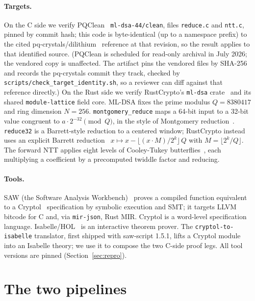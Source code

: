 \documentclass[journal=tches,submission,review]{iacrtrans}
\newcommand{\code}[1]{\texttt{#1}}
\begin{document}
\paragraph{Targets.} On the C side we verify PQClean~\cite{pqclean} \code{ml-dsa-44/clean}, files
\code{reduce.c} and \code{ntt.c}, pinned by commit hash; this code is byte-identical (up to a namespace
prefix) to the cited pq-crystals/dilithium~\cite{dilithiumref} reference at that revision, so the result
applies to that identified source. (PQClean is scheduled for read-only archival in July 2026; the
vendored copy is unaffected. The artifact pins the vendored files by SHA-256 and records the
pq-crystals commit they track, checked by \code{scripts/check\_target\_identity.sh}, so a reviewer can
diff against that reference directly.) On the Rust side we verify
RustCrypto's \code{ml-dsa} crate~\cite{rustcrypto} and its shared \code{module-lattice} field core. ML-DSA
fixes the prime modulus $Q = 8380417$ and ring dimension $N = 256$. \code{montgomery\_reduce} maps a
64-bit input to a 32-bit value congruent to $a \cdot 2^{-32} \pmod Q$, in the style of Montgomery
reduction~\cite{montgomery}. \code{reduce32} is a Barrett-style reduction to a centered window;
RustCrypto instead uses an explicit Barrett reduction~\cite{barrett}
$x \mapsto x - \lfloor (x \cdot M) / 2^{k} \rfloor\, Q$ with $M = \lfloor 2^{k}/Q \rfloor$. The forward
NTT applies eight levels of Cooley-Tukey butterflies~\cite{cooleytukey}, each multiplying a coefficient
by a precomputed twiddle factor and reducing.

\paragraph{Tools.} SAW (the Software Analysis Workbench)~\cite{saw} proves a compiled function
equivalent to a Cryptol~\cite{cryptol} specification by symbolic execution and SMT; it targets LLVM
bitcode for C and, via \code{mir-json}, Rust MIR. Cryptol is a word-level specification language.
Isabelle/HOL~\cite{isabelle} is an interactive theorem prover. The \code{cryptol-to-isabelle} translator, first shipped with saw-script
1.5.1, lifts a Cryptol module into an Isabelle theory; we use it to compose the two C-side proof legs.
All tool versions are pinned (Section~\ref{sec:repro}).

\section{The two pipelines}\label{sec:pipeline}
\end{document}
